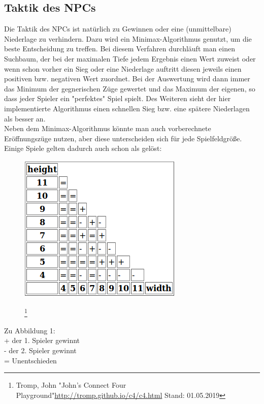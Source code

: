 \documentclass[12pt,a4paper,ngerman]{article}
\begin{document}
	\subsection{Taktik des NPCs}
	Die Taktik des NPCs ist natürlich zu Gewinnen oder eine (unmittelbare) Niederlage zu verhindern. Dazu wird ein Minimax-Algorithmus genutzt, um die beste Entscheidung zu treffen. Bei diesem Verfahren durchläuft man einen Suchbaum, der bei der maximalen Tiefe jedem Ergebnis einen Wert zuweist oder wenn schon vorher ein Sieg oder eine Niederlage auftritt diesen jeweils einen positiven bzw. negativen Wert zuordnet. Bei der Auswertung wird dann immer das Minimum der gegnerischen Züge gewertet und das Maximum der eigenen, so dass jeder Spieler ein "perfektes" Spiel spielt. Des Weiteren sieht der hier implementierte Algorithmus einen schnellen Sieg bzw. eine spätere Niederlagen als besser an.
	\\
	Neben dem Minimax-Algorithmus könnte man auch vorberechnete Eröffnungszüge nutzen, aber diese unterscheiden sich für jede Spielfeldgröße. Einige Spiele gelten dadurch auch schon als gelöst:
	\begin{figure}
		\centering
		\includegraphics[width=0.7\linewidth]{w-h-viergew}
		\caption{}
		\label{fig:w-h-viergew}
		\footnote{Tromp, John  "John's Connect Four Playground"\url{http://tromp.github.io/c4/c4.html} Stand: 01.05.2019}
	\end{figure}
    \newpage
	Zu Abbildung 1:\\
	+ der 1. Spieler gewinnt\\
	- der 2. Spieler gewinnt\\
	= Unentschieden\\
	
	
	
\end{document}
